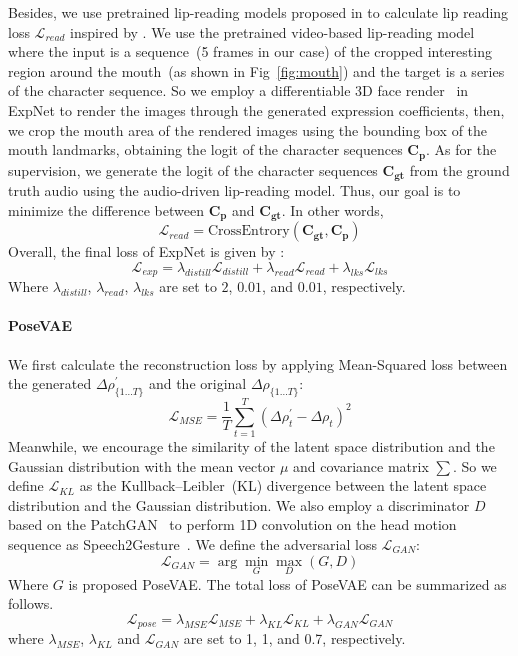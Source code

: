 Besides, we use pretrained lip-reading models proposed in \cite{ma2022training} to calculate lip reading loss $\mathcal{L}_{read}$ inspired by \cite{spectre}. We use the pretrained video-based lip-reading model where the input is a sequence~(5 frames in our case) of the cropped interesting region around the mouth~(as shown in Fig~\ref{fig:mouth}) and the target is a series of the character sequence. So we employ a differentiable 3D face render~\cite{deng2019accurate} in ExpNet to render the images through the generated expression coefficients, then, we crop the mouth area of the rendered images using the bounding box of the mouth landmarks, obtaining the logit of the character sequences $\mathbf{C_p}$. As for the supervision, we generate the logit of the character sequences $\mathbf{C_{gt}}$ from the ground truth audio using the audio-driven lip-reading model. Thus, our goal is to minimize the difference between $\mathbf{C_p}$ and $\mathbf{C_{gt}}$. In other words,  
\begin{equation}
    \mathcal{L}_{read}= \text{CrossEntrory}(\mathbf{C_{gt}}, \mathbf{C_p})
\end{equation}
Overall, the final loss of ExpNet is given by :
\begin{equation}
    \mathcal{L}_{exp}=\lambda_{distill} \mathcal{L}_{distill}+\lambda_{read} \mathcal{L}_{read} + \lambda_{lks} \mathcal{L}_{lks}
\end{equation}
Where $\lambda_{distill}$, $\lambda_{read}$, $\lambda_{lks}$ are set to $2$, $0.01$, and $0.01$, respectively.

 

\paragraph{PoseVAE} We first calculate the reconstruction loss by applying Mean-Squared loss between the generated $\Delta \rho^\prime_{\{1 \ldots T\}}$ and the original $\Delta \rho_{\{1 \ldots T\}}$: 
\begin{equation}
\mathcal{L}_{MSE} = \frac{1}{T} \sum_{t=1}^{T}\left(\Delta \rho^{\prime}_t - \Delta \rho_t \right)^{2}
\end{equation}
Meanwhile, we encourage the similarity of the latent space distribution  and the Gaussian distribution with the mean vector ${\mu}$ and covariance matrix ${\sum}$. So we define $\mathcal{L}_{KL}$ as the Kullback–Leibler~(KL) divergence between the latent space distribution and the Gaussian distribution.
We also employ a discriminator $D$ based on the PatchGAN~\cite{pix2pix} to perform 1D convolution on the head motion sequence as Speech2Gesture~\cite{speech2gesture}. We define the adversarial loss $\mathcal{L}_{GAN}$:
\begin{equation}
\mathcal{L}_{GAN} = \arg \min _{G} \max _{D}\left(G, D\right)
\end{equation}
Where $G$ is proposed PoseVAE. The total loss of PoseVAE can be summarized as follows. 
\begin{equation}
\mathcal{L}_{pose} = \lambda_{MSE} \mathcal{L}_{MSE}+\lambda_{KL} \mathcal{L}_{KL} + \lambda_{GAN} \mathcal{L}_{GAN}
\end{equation}
where $\lambda_{MSE}$, $\lambda_{KL}$ and $\mathcal{L}_{GAN}$ are set to 1, 1, and 0.7, respectively.


